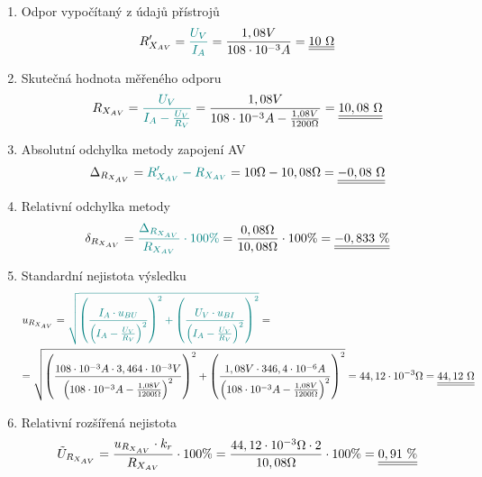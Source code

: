 \documentclass[a4paper, czech]{article}
\begin{document}
\begin{enumerate}
    \item Odpor vypočítaný z údajů přístrojů
    \begin{multline*}
        R'_{X_{AV}} = \textcolor{teal}{\frac{U_V}{I_A}} = \frac{1,08V}{108 \cdot 10^{-3}A} = \underline{\underline{10\ \Omega}} \hfill
    \end{multline*}
    \item Skutečná hodnota měřeného odporu
    \begin{multline*}
        R_{X_{AV}} = \textcolor{teal}{\frac{U_V}{I_A - \frac{U_V}{R_V}}} = \frac{1,08V}{108 \cdot 10^{-3}A - \frac{1,08V}{1200 \Omega}} = \underline{\underline{10,08\ \Omega}} \hfill
    \end{multline*}
    \item Absolutní odchylka metody zapojení AV
    \begin{multline*}
        \Delta_{R_{X_{AV}}} = \textcolor{teal}{R'_{X_{AV}} - R_{X_{AV}}} = 10 \Omega - 10,08 \Omega = \underline{\underline{-0,08\ \Omega}} \hfill
    \end{multline*}
    \item Relativní odchylka metody
    \begin{multline*}
        \delta_{R_{X_{AV}}} = \textcolor{teal}{\frac{\Delta_{R_{X_{AV}}}}{R_{X_{AV}}} \cdot 100\%} = \frac{0,08 \Omega}{10,08 \Omega} \cdot 100\% = \underline{\underline{-0,833\ \%}} \hfill
    \end{multline*}
    \item Standardní nejistota výsledku
    \begin{multline*}
        u_{R_{X_{AV}}} = \textcolor{teal}{\sqrt{\left(\frac{I_A \cdot u_{BU}}{\left(I_A - \frac{U_V}{R_V}\right)^2}\right)^2 + \left(\frac{U_V \cdot u_{BI}}{\left(I_A - \frac{U_V}{R_V}\right)^2}\right)^2}} = \hfill \\
        = \sqrt{\left(\frac{108 \cdot 10^{-3}A \cdot 3,464 \cdot 10^{-3}V}{\left(108 \cdot 10^{-3}A - \frac{1,08V}{1200 \Omega}\right)^2}\right)^2 + \left(\frac{1,08V \cdot 346,4 \cdot 10^{-6} A}{\left(108 \cdot 10^{-3}A - \frac{1,08V}{1200 \Omega}\right)^2}\right)^2} = 44,12 \cdot 10^{-3} \Omega = \underline{\underline{44,12\ \Omega}} \hfill
    \end{multline*}
    \item Relativní rozšířená nejistota
    \begin{multline*}
        \tilde{U}_{R_{X_{AV}}} = \frac{u_{R_{X_{AV}}} \cdot k_r}{R_{X_{AV}}} \cdot 100\% = \frac{44,12 \cdot 10^{-3} \Omega \cdot 2}{10,08 \Omega} \cdot 100\% = \underline{\underline{0,91\ \%}} \hfill
    \end{multline*}
\end{enumerate}
\end{document}
